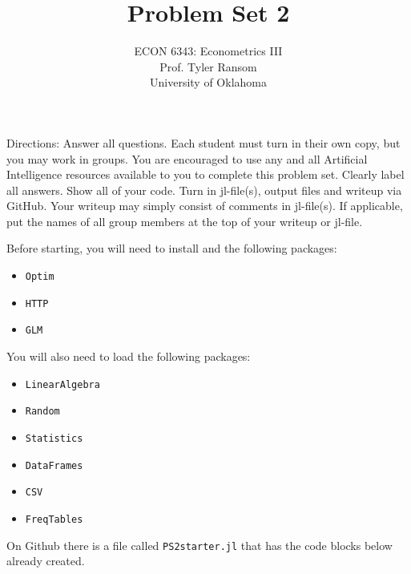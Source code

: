 \documentclass[12pt,english]{article}
\begin{document}
\title{Problem Set 2}
\author{ECON 6343: Econometrics III\\
Prof. Tyler Ransom\\
University of Oklahoma}
\date{}%

\maketitle
Directions: Answer all questions. Each student must turn in their own copy, but you may work in groups. You are encouraged to use any and all Artificial Intelligence resources available to you to complete this problem set. Clearly label all answers. Show all of your code. Turn in jl-file(s), output files and writeup via GitHub. Your writeup may simply consist of comments in jl-file(s). If applicable, put the names of all group members at the top of your writeup or jl-file.


Before starting, you will need to install and the following packages:
\begin{itemize}
    \item[~] \texttt{Optim} 
    \item[~] \texttt{HTTP} 
    \item[~] \texttt{GLM} 
\end{itemize}

You will also need to load the following packages:
\begin{itemize}
    \item[~] \texttt{LinearAlgebra} 
    \item[~] \texttt{Random} 
    \item[~] \texttt{Statistics} 
    \item[~] \texttt{DataFrames} 
    \item[~] \texttt{CSV} 
    \item[~] \texttt{FreqTables}
\end{itemize}

On Github there is a file called \texttt{PS2starter.jl} that has the code blocks below already created.
\end{document}
